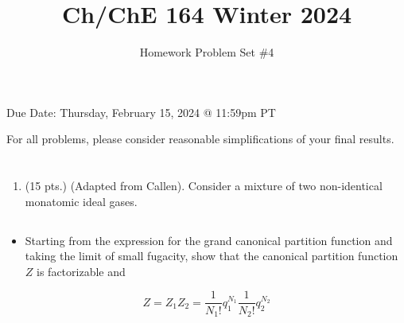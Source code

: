 \documentclass[12pt]{article}
\title{Ch/ChE 164 Winter 2024 }
\author{Homework Problem Set \#4}
\date{}
\begin{document}
\maketitle
Due Date: Thursday, February 15, 2024 @ 11:59pm PT

For all problems, please consider reasonable simplifications of your final results.
\section{}
\begin{enumerate}
  \item (15 pts.) (Adapted from Callen). Consider a mixture of two non-identical monatomic ideal gases.
\end{enumerate}
\subsection{}
\begin{itemize}
  \item Starting from the expression for the grand canonical partition function and taking the limit of small fugacity, show that the canonical partition function $Z$ is factorizable and
\end{itemize}

$$
Z=Z_{1} Z_{2}=\frac{1}{N_{1} !} q_{1}^{N_{1}} \frac{1}{N_{2} !} q_{2}^{N_{2}}
$$
\end{document}
